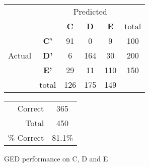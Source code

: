\begin{figure}[!ht]
\begin{minipage}[b]{0.5\linewidth}
\centering
	\begin{tabular}{ccc|c|c|c}
	 & &\multicolumn{3}{c}{Predicted} &\\
	  & & \bf{C} &  \bf{D} & \bf{E} & total \\
	 \cline{3-6}
	 \multirow{3}{*}{\begin{sideways}Actual\end{sideways}} & \bf{C'}& 91 & 0 & 9 & 100\\
	 \cline{3-6}
	 & \bf{D'}& 6 & 164 & 30 & 200\\
	  \cline{3-6}
	 & \bf{E'}& 29 & 11 & 110 &  150\\
	  \cline{3-6}
	 &total&126&175&149\\
	\end{tabular}
\end{minipage}
\hspace{0.5cm}
\begin{minipage}[b]{0.5\linewidth}
	\begin{tabular}{r|c}
	\hline
	Correct& 365\\
	Total& 450\\
	\hline
	\% Correct& 81.1\%\\
	\hline
	\end{tabular}
\end{minipage}
\vspace{1mm}
\caption{GED performance on C, D and E}
\end{figure}

\clearpage

